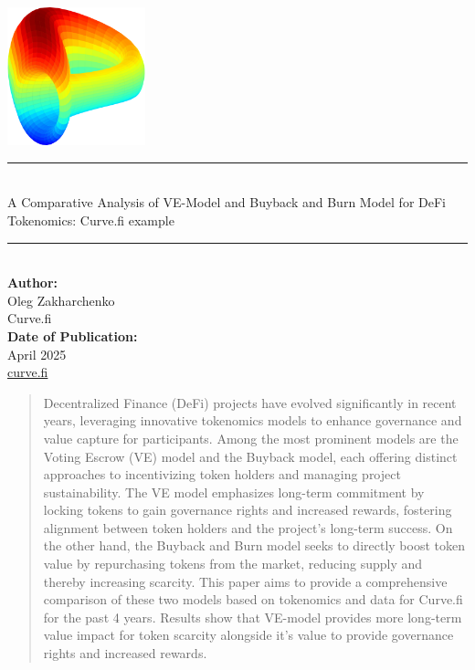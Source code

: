 \documentclass[notitlepage]{revtex4-2}
\begin{document}
    \begin{titlepage}
        \centering
        \includegraphics[width=0.3\textwidth]{images/curve-dao-token-crv-logo}\\[1cm]
        \rule{\textwidth}{0.5mm}\\[0.5cm]
        {\Large A Comparative Analysis of VE-Model and Buyback and Burn Model for DeFi Tokenomics: Curve.fi example}\\[0.5cm]
        \rule{\textwidth}{0.5mm}\\[1.5cm]

        \textbf{Author:}\\
        Oleg Zakharchenko \\[1cm]
        Curve.fi \\[1cm]

        \vfill
        \textbf{Date of Publication:}\\
        April 2025\\[1cm]

        \href{https://curve.fi}{curve.fi}\\
    \end{titlepage}



\begin{abstract}
    Decentralized Finance (DeFi) projects have evolved significantly in recent years, leveraging innovative tokenomics
    models to enhance governance and value capture for participants.
    Among the most prominent models are the Voting Escrow (VE) model and the Buyback model, each offering distinct
    approaches to incentivizing token holders and managing project sustainability.
    The VE model emphasizes long-term commitment by locking tokens to gain governance rights and increased rewards,
    fostering alignment between token holders and the project’s long-term success.
    On the other hand, the Buyback and Burn model seeks to directly boost token value by repurchasing tokens from the market,
    reducing supply and thereby increasing scarcity.
    This paper aims to provide a comprehensive comparison of these two models based on tokenomics and data for Curve.fi
    for the past 4 years.
    Results show that VE-model provides more long-term value impact for token scarcity alongside it's value to provide
    governance rights and increased rewards.
\end{abstract}
\end{document}
